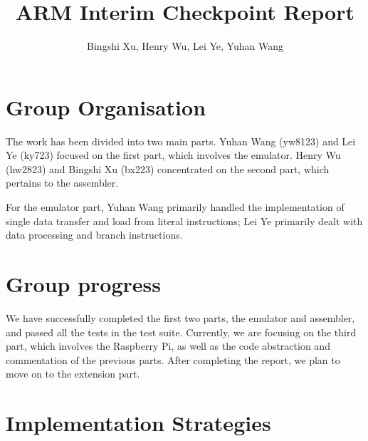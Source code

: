 \documentclass[11pt]{article}
\begin{document}
\title{ARM Interim Checkpoint Report}
\author{Bingshi Xu, Henry Wu, Lei Ye, Yuhan Wang}

\maketitle


\section{Group Organisation}

The work has been divided into two main parts. Yuhan Wang (yw8123) and Lei Ye (ky723) focused on the first part,
which involves the emulator.
Henry Wu (hw2823) and Bingshi Xu (bx223) concentrated on the second part,
which pertains to the assembler.

For the emulator part, Yuhan Wang primarily handled the implementation of single data transfer and load from literal instructions;
Lei Ye primarily dealt with data processing and branch instructions.

\section{Group progress}
We have successfully completed the first two parts, the emulator and assembler, and passed all the tests in the test suite. 
Currently, we are focusing on the third part, which involves the Raspberry Pi, 
as well as the code abstraction and commentation of the previous parts. 
After completing the report, we plan to move on to the extension part.

\section{Implementation Strategies}
\end{document}
